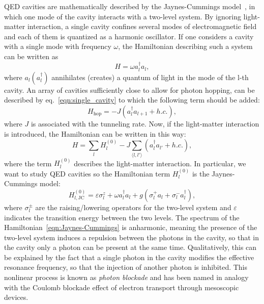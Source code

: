 QED cavities are mathematically described by the Jaynes-Cummings model~\cite{shore_knight}, in which one mode of the cavity interacts with a two-level system. By ignoring light-matter interaction, a single cavity confines several modes of electromagnetic field and each of them is quantized as a harmonic oscillator. If one considers a cavity with a single mode with frequency $\omega$, the Hamiltonian describing such a system can be written as
\begin{equation}
\label{eqn:single_cavity}
    H = \omega a^{\dagger}_la_l,
\end{equation}
where $a_l (a_l^{\dagger})$ annihilates (creates) a quantum of light in the mode of the l-th cavity.
An array of cavities sufficiently close to allow for photon hopping, can be described by eq.~\ref{eqn:single_cavity} to which the following term should be added:
\begin{equation}
    H_{\text{hop}} = -J (a^{\dagger}_la_{l+1} + h.c.),
\end{equation}
where $J$ is associated with the tunneling rate.
Now, if the light-matter interaction is introduced, the Hamiltonian can be written in this way:
\begin{equation}
    H = \sum_l H_l^{(0)} - J \sum_{\langle l, l' \rangle}(a^{\dagger}_la_{l'} + h.c.),
\end{equation}
where the term $H_l^{(0)}$ describes the light-matter interaction. In particular, we want to study QED cavities so the Hamiltonian term $H_l^{(0)}$ is the Jaynes-Cummings model:
\begin{equation}
\label{eqn:Jaynes-Cummings}
    H_{l,\text{JC}}^{(0)} = \varepsilon \sigma^z_l + \omega a^{\dagger}_la_l + g(\sigma^+_l a_l + \sigma^-_l a_l^{\dagger}),
\end{equation}
where $\sigma^\pm_l$ are the raising/lowering operators for the two-level system and $\varepsilon$ indicates the transition energy between the two levels.
The spectrum of the Hamiltonian~\ref{eqn:Jaynes-Cummings} is anharmonic, meaning the presence of the two-level system induces a repulsion between the photons in the cavity, so that in the cavity only a photon can be present at the same time. Qualitatively, this can be explained by the fact that a single photon in the cavity modifies the effective resonance frequency, so that the injection of another photon is inhibited. This nonlinear process is known as \emph{photon blockade} and has been named in analogy with the Coulomb blockade effect of electron transport through mesoscopic devices.

